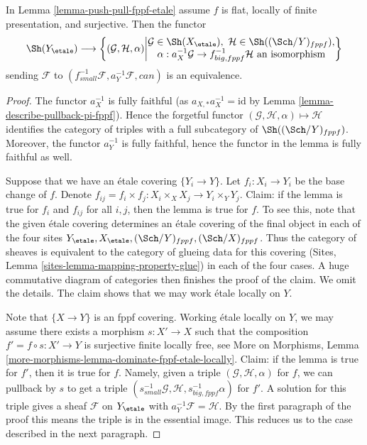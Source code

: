 \begin{lemma}
\label{lemma-descent-sheaf-fppf-etale}
In Lemma \ref{lemma-push-pull-fppf-etale} assume
$f$ is flat, locally of finite presentation, and surjective.
Then the functor
$$
\Sh(Y_\etale) \longrightarrow
\left\{
(\mathcal{G}, \mathcal{H}, \alpha)
\middle|
\begin{matrix}
\mathcal{G} \in \Sh(X_\etale),\ \mathcal{H} \in \Sh((\Sch/Y)_{fppf}), \\
\alpha : a_X^{-1}\mathcal{G} \to f_{big, fppf}^{-1}\mathcal{H}
\text{ an isomorphism}
\end{matrix}
\right\}
$$
sending $\mathcal{F}$ to
$(f_{small}^{-1}\mathcal{F}, a_Y^{-1}\mathcal{F}, can)$ is an equivalence.
\end{lemma}

\begin{proof}
The functor $a_X^{-1}$ is fully faithful (as $a_{X, *}a_X^{-1} = \text{id}$ by
Lemma \ref{lemma-describe-pullback-pi-fppf}). Hence the forgetful functor
$(\mathcal{G}, \mathcal{H}, \alpha) \mapsto \mathcal{H}$ identifies the
category of triples with a full subcategory of $\Sh((\Sch/Y)_{fppf})$.
Moreover, the functor $a_Y^{-1}$ is fully faithful, hence the functor
in the lemma is fully faithful as well.

\medskip\noindent
Suppose that we have an \'etale covering $\{Y_i \to Y\}$.
Let $f_i : X_i \to Y_i$ be the base change of $f$.
Denote $f_{ij} = f_i \times f_j : X_i \times_X X_j  \to Y_i \times_Y Y_j$.
Claim: if the lemma is true for $f_i$ and $f_{ij}$ for all $i, j$, then
the lemma is true for $f$. To see this, note that the given \'etale covering
determines an \'etale covering of the final object in each of
the four sites $Y_\etale, X_\etale, (\Sch/Y)_{fppf}, (\Sch/X)_{fppf}$.
Thus the category of sheaves is equivalent to the category of
glueing data for this covering
(Sites, Lemma \ref{sites-lemma-mapping-property-glue})
in each of the four cases. A huge commutative diagram of
categories then finishes the proof of the claim. We omit the details.
The claim shows that we may work \'etale locally on $Y$.

\medskip\noindent
Note that $\{X \to Y\}$ is an fppf covering. Working \'etale locally on $Y$,
we may assume there exists a morphism $s : X' \to X$ such that the composition
$f' = f \circ s : X' \to Y$ is surjective finite locally free, see
More on Morphisms, Lemma
\ref{more-morphisms-lemma-dominate-fppf-etale-locally}.
Claim: if the lemma is true for $f'$, then it is true for $f$.
Namely, given a triple $(\mathcal{G}, \mathcal{H}, \alpha)$
for $f$, we can pullback by $s$ to get a triple
$(s_{small}^{-1}\mathcal{G}, \mathcal{H}, s_{big, fppf}^{-1}\alpha)$
for $f'$. A solution for this triple gives a sheaf
$\mathcal{F}$ on $Y_\etale$ with $a_Y^{-1}\mathcal{F} = \mathcal{H}$.
By the first paragraph of the proof this means the triple is
in the essential image. This reduces us to
the case described in the next paragraph.


\end{proof}
